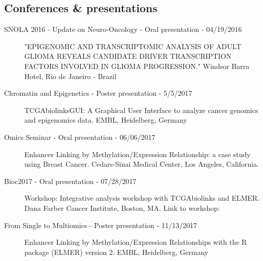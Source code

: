 \subsection{Conferences \& presentations}
\begin{description}
	\item[SNOLA 2016 - Update on Neuro-Oncology - Oral presentation - 04/19/2016]{"EPIGENOMIC AND TRANSCRIPTOMIC ANALYSIS OF ADULT GLIOMA REVEALS CANDIDATE DRIVER TRANSCRIPTION FACTORS INVOLVED IN GLIOMA PROGRESSION." Windsor Barra Hotel, Rio de Janeiro - Brazil}
    \item[Chromatin and Epigenetics - Poster presentation - 5/5/2017]{TCGAbiolinksGUI: A Graphical User Interface to analyze cancer genomics and epigenomics data. EMBL, Heidelberg, Germany}
	\item[Omics Seminar - Oral presentation - 06/06/2017]{Enhancer Linking by Methylation/Expression Relationship: a case study using Breast Cancer. Cedars-Sinai Medical Center, Los Angeles, California.}
	\item[Bioc2017 - Oral presentation - 07/28/2017]{Workshop: Integrative analysis workshop with TCGAbiolinks and ELMER. Dana Farber Cancer Institute, Boston, MA. Link to workshop: }
\item[From Single to Multiomics - Poster presentation - 11/13/2017]{Enhancer Linking by Methylation/Expression Relationships with the R package (ELMER) version 2. EMBL, Heidelberg, Germany}

\end{description}


%

